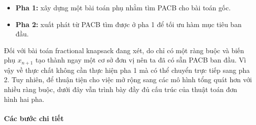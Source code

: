 \documentclass[fontsize=13pt,a4paper]{report}
\begin{document}
\begin{itemize}
    \item \textbf{Pha 1:} xây dựng một bài toán phụ nhằm tìm PACB cho bài toán gốc.
    \item \textbf{Pha 2:} xuất phát từ PACB tìm được ở pha 1 để tối ưu hàm mục tiêu ban đầu.
\end{itemize}

Đối với bài toán fractional knapsack đang xét, do chỉ có một ràng buộc và biến phụ \(x_{n+1}\) tạo thành ngay một cơ sở đơn vị nên ta đã có sẵn PACB ban đầu. Vì vậy về thực chất không cần thực hiện pha 1 mà có thể chuyển trực tiếp sang pha 2. Tuy nhiên, để thuận tiện cho việc mở rộng sang các mô hình tổng quát hơn với nhiều ràng buộc, dưới đây vẫn trình bày đầy đủ cấu trúc của thuật toán đơn hình hai pha.

\paragraph{Các bước chi tiết}
\end{document}
